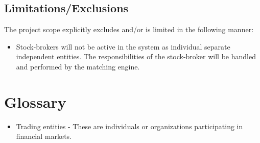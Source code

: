 \documentclass[12pt]{article}
\begin{document}
		\subsection{Limitations/Exclusions}
		The project scope explicitly excludes and/or is limited in the following manner:
		\begin{itemize}
		\item Stock-brokers will not be active in the system as individual separate independent entities. The responsibilities of the stock-broker will be handled and performed by the matching engine.
		\end{itemize}
	
		
	\newpage				    
	\section{Glossary}
	\begin{itemize}
	\item Trading entities - These are individuals or organizations participating in financial markets.
	\end{itemize}					    			    			    		
\end{document}
